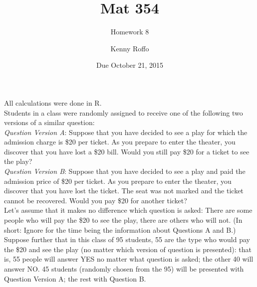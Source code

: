 \documentclass{scrartcl}
\title{Mat 354}
\subtitle{Homework 8}
\author{Kenny Roffo}
\date{Due October 21, 2015}
\begin{document}
\maketitle

All calculations were done in R.\\

Students in a class were randomly assigned to receive one of the following two versions of a similar question:\\

\emph{Question Version A}: Suppose that you have decided to see a play for which the admission charge is \$20 per ticket. As you prepare to enter the theater, you discover that you have lost a \$20 bill. Would you still pay \$20 for a ticket to see the play?\\

\emph{Question Version B}: Suppose that you have decided to see a play and paid the admission price of \$20 per ticket. As you prepare to enter the theater, you discover that you have lost the ticket. The seat was not marked and the ticket cannot be recovered. Would you pay \$20 for another ticket?\\

Let’s assume that it makes no difference which question is asked: There are some people who will pay the \$20 to see the play, there are others who will not. (In short: Ignore for the time being the information about Questions A and B.) Suppose further that in this class of 95 students, 55 are the type who would pay the \$20 and see the play (no matter which version of question is presented): that is, 55 people will answer YES no matter what question is asked; the other 40 will answer NO. 45 students (randomly chosen from the 95) will be presented with Question Version A; the rest with Question B.
\end{document}
